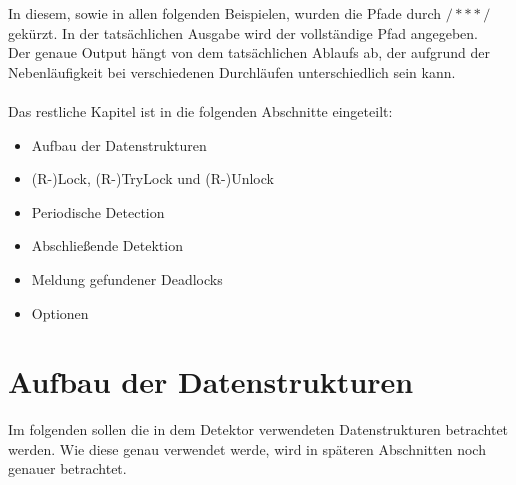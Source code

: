 In diesem, sowie in allen folgenden Beispielen, wurden die Pfade durch $/***/$ 
gekürzt. In der tatsächlichen
Ausgabe wird der vollständige Pfad angegeben.\\ 
Der genaue Output hängt von dem tatsächlichen Ablaufs ab, der aufgrund der 
Nebenläufigkeit bei verschiedenen Durchläufen unterschiedlich sein kann.\\\\
Das restliche Kapitel ist in die folgenden Abschnitte eingeteilt:
\begin{itemize}
  \item Aufbau der Datenstrukturen
  \item (R-)Lock, (R-)TryLock und (R-)Unlock
  \item Periodische Detection
  \item Abschließende Detektion
  \item Meldung gefundener Deadlocks
  \item Optionen
\end{itemize}
\section{Aufbau der Datenstrukturen} \label{Kap::Implementation:Datastructures}
Im folgenden sollen die in dem Detektor verwendeten Datenstrukturen betrachtet 
werden. Wie diese genau verwendet werde, wird in späteren Abschnitten noch 
genauer betrachtet.
